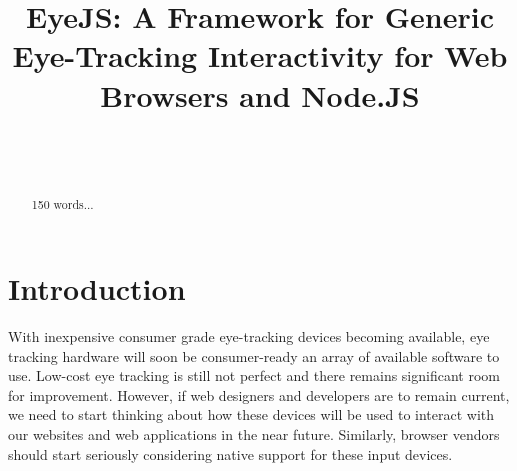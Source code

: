 \documentclass{sigchi}
\begin{document}
\title{EyeJS: A Framework for Generic Eye-Tracking Interactivity for Web Browsers and Node.JS}

\author{%
  \\
  \\
}

\maketitle



\begin{abstract}
  150 words...
\end{abstract}









\section{Introduction}
With inexpensive consumer grade eye-tracking devices becoming available, 
eye tracking hardware will soon be consumer-ready an array of available 
software to use. Low-cost eye tracking is still not perfect and there 
remains significant room for improvement. However, if web designers and 
developers are to remain current, we need to start thinking about how 
these devices will be used to interact with our websites and web 
applications in the near future. Similarly, browser vendors should start seriously considering native support for these input devices.
\end{document}
